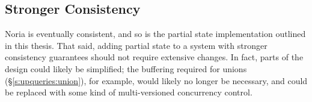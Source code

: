 \subsection{Stronger Consistency}

Noria is eventually consistent, and so is the partial state implementation
outlined in this thesis. That said, adding partial state to a system with
stronger consistency guarantees should not require extensive changes. In fact,
parts of the design could likely be simplified; the buffering required for
unions (\S\ref{s:upqueries:union}), for example, would likely no longer be
necessary, and could be replaced with some kind of multi-versioned concurrency
control.
